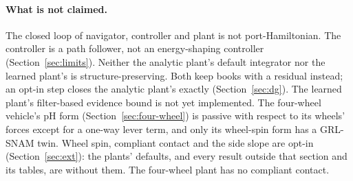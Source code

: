 \documentclass[11pt]{article}
\theoremstyle{remark}
\begin{document}
\paragraph{What is not claimed.} The closed loop of navigator, controller and plant is not
port-Hamiltonian. The controller is a path follower, not an energy-shaping controller
(Section~\ref{sec:limits}). Neither the analytic plant's default integrator nor the learned
plant's is structure-preserving. Both keep books with a residual instead; an opt-in step closes the
analytic plant's exactly (Section~\ref{sec:dg}). The learned plant's filter-based
evidence bound is not yet implemented. The four-wheel vehicle's pH form
(Section~\ref{sec:four-wheel}) is passive with respect to its wheels' forces except for a one-way
lever term, and only its wheel-spin form has a GRL-SNAM twin. Wheel spin, compliant contact and
the side slope are opt-in (Section~\ref{sec:ext}): the plants' defaults, and every result outside
that section and its tables, are without them. The four-wheel plant has no compliant contact.
\end{document}
